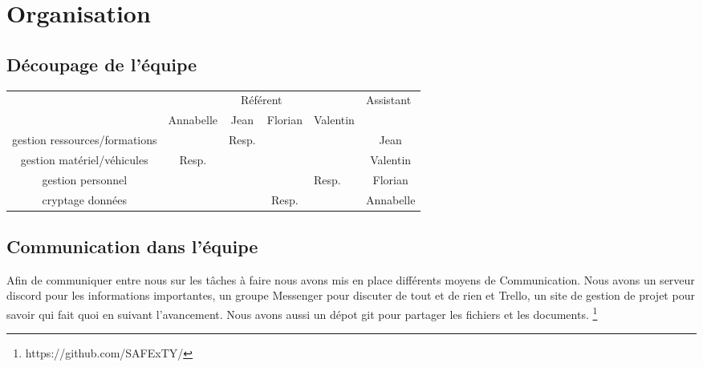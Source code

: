 \section{Organisation}
\subsection{Découpage de l'équipe}


\begin{table}[h]
\begin{tabular}{c|c|c|c|l|c|}
\cline{2-6}
\multicolumn{1}{l|}{}                & \multicolumn{4}{c|}{Référent}         & \multicolumn{1}{l|}{Assistant} \\ \cline{2-6} 
                                     & Annabelle & Jean & Florian & Valentin &                                \\ \hline
\multicolumn{1}{|c|}{gestion ressources/formations} &           & Resp.   &         &          &            Jean                    \\ \hline
\multicolumn{1}{|c|}{gestion matériel/véhicules}               & Resp.         &      &         &          &            Valentin                    \\ \hline
\multicolumn{1}{|c|}{gestion personnel}               &           &      &        &   Resp.       &            Florian                    \\ \hline
\multicolumn{1}{|c|}{cryptage données}               &           &      &     Resp.    &            &               Annabelle                 \\ \hline
\end{tabular}
\end{table}
\subsection{Communication dans l'équipe}
Afin de communiquer entre nous sur les tâches à faire nous avons mis en place différents moyens de Communication. Nous avons un serveur discord pour les informations importantes, un groupe Messenger pour discuter de tout et de rien et Trello, un site de gestion de projet pour savoir qui fait quoi en suivant l'avancement. Nous avons aussi un dépot git pour partager les fichiers et les documents. \footnote{https://github.com/SAFExTY/}

